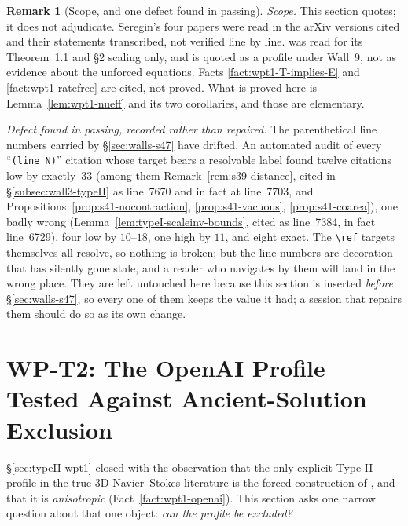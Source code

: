 \documentclass[11pt]{article}
\theoremstyle{definition}
\newtheorem{remark}[theorem]{Remark}
\theoremstyle{remark}
\begin{document}
\begin{remark}[Scope, and one defect found in passing]
  \label{rem:wpt1-scope}
  \emph{Scope.} This section quotes; it does not adjudicate. Seregin's four
  papers were read in the arXiv versions cited and their statements
  transcribed, not verified line by line. \cite{OpenAI2026} was read for its
  Theorem~1.1 and \S2 scaling only, and is quoted as a profile under Wall~9,
  not as evidence about the unforced equations. Facts
  \ref{fact:wpt1-T-implies-E} and \ref{fact:wpt1-ratefree} are cited, not
  proved. What is proved here is Lemma~\ref{lem:wpt1-nueff} and its two
  corollaries, and those are elementary.

  \emph{Defect found in passing, recorded rather than repaired.} The
  parenthetical line numbers carried by \S\ref{sec:walls-s47} have drifted.
  An automated audit of every ``\texttt{(line~N)}'' citation whose target
  bears a resolvable label found twelve citations low by exactly~$33$
  (among them Remark~\ref{rem:s39-distance}, cited in
  \S\ref{subsec:wall3-typeII} as line~7670 and in fact at line~7703, and
  Propositions~\ref{prop:s41-nocontraction}, \ref{prop:s41-vacuous},
  \ref{prop:s41-coarea}), one badly wrong
  (Lemma~\ref{lem:typeI-scaleinv-bounds}, cited as line~7384, in fact
  line~6729), four low by $10$--$18$, one high by $11$, and eight exact. The
  \verb|\ref| targets themselves all resolve, so nothing is broken; but the
  line numbers are decoration that has silently gone stale, and a reader who
  navigates by them will land in the wrong place. They are left untouched
  here because this section is inserted \emph{before}
  \S\ref{sec:walls-s47}, so every one of them keeps the value it had; a
  session that repairs them should do so as its own change.
\end{remark}
\section{WP-T2: The OpenAI Profile Tested Against Ancient-Solution
Exclusion}
\label{sec:wpt2-openai}

\S\ref{sec:typeII-wpt1} closed with the observation that the only explicit
Type-II profile in the true-3D-Navier--Stokes literature is the forced
construction of \cite{OpenAI2026}, and that it is \emph{anisotropic}
(Fact~\ref{fact:wpt1-openai}). This section asks one narrow question about
that one object: \emph{can the profile be excluded?}
\end{document}
